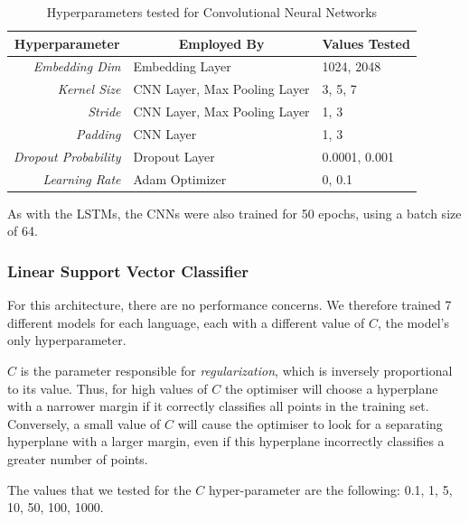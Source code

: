 \documentclass[letterpaper,11pt]{article}
\begin{document}
\begin{table}[H]
  \centering
  \begin{tabular}{@{}rll@{}}
  \toprule
  \multicolumn{1}{c}{\textbf{Hyperparameter}} & \multicolumn{1}{c}{\textbf{Employed By}} & \textbf{Values Tested} \\ \midrule
  \textit{Embedding Dim}                   & Embedding Layer                          & 1024, 2048             \\
  \textit{Kernel Size}                   & CNN Layer, Max Pooling Layer             & 3, 5, 7                \\
  \textit{Stride}                   & CNN Layer, Max Pooling Layer             & 1, 3                   \\
  \textit{Padding}                   & CNN Layer                                & 1, 3                   \\
  \textit{Dropout Probability}                   & Dropout Layer                            & 0.0001, 0.001          \\
  \textit{Learning Rate}                   & Adam Optimizer                           & 0, 0.1                 \\ \bottomrule
  \end{tabular}
  \caption{Hyperparameters tested for Convolutional Neural Networks}
  \label{table:CNN_hyperparameters}
\end{table}


As with the LSTMs, the CNNs were also trained for 50 epochs, using a batch size of 64.

\subsubsection*{Linear Support Vector Classifier}

For this architecture, there are no performance concerns. We therefore trained 7 different models for each language, each with a different value of $C$, the model's only hyperparameter.

$C$ is the parameter responsible for \textit{regularization}, which is inversely proportional to its value. Thus, for high values of $C$ the optimiser will choose a hyperplane with a narrower margin if it correctly classifies all points in the training set. Conversely, a small value of $C$ will cause the optimiser to look for a separating hyperplane with a larger margin, even if this hyperplane incorrectly classifies a greater number of points. 

The values that we tested for the $C$ hyper-parameter are the following: 0.1, 1, 5, 10, 50, 100, 1000.
\end{document}
